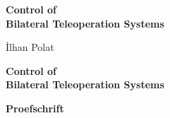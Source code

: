 
\newcommand{\thetitle}{Control of \\[2mm] Bilateral Teleoperation Systems}
\newcommand{\thesubtitle}{}
\renewcommand{\theauthor}{İlhan Polat}
\pagestyle{phdstayla} %
\vspace*{30mm}

\thispagestyle{empty}
\begin{center}
    \textbf{\huge \thetitle}\\[\baselineskip]\textbf{\LARGE \thesubtitle}
\end{center}

\vspace{20mm}
\begin{center}
    \Large\theauthor
\end{center}
\newpage

\thispagestyle{empty}

%
\vspace*{\fill}{\tiny .}
%
\newpage
\thispagestyle{empty}
\vspace*{30mm}

\begin{center}
     \textbf{\huge \thetitle}
\end{center}

\vspace{30mm}

\begin{center}
    \textbf{Proefschrift}
\end{center}

